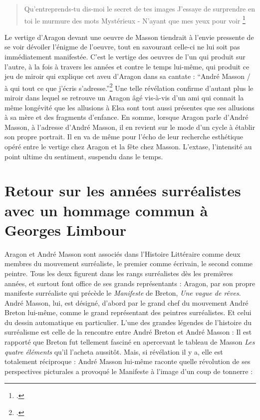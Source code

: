 \begin{verse}
Qu’entreprends-tu dis-moi le secret de tes images
J’essaye de surprendre en toi le murmure des mots
Mystérieux - N’ayant que mes yeux pour voir	
\footcite[p685]{ecritssurla}\end{verse}

	Le vertige d’Aragon devant une oeuvre de Masson tiendrait à l’envie pressente de se voir dévoiler l’énigme de l’oeuvre, tout en savourant celle-ci ne lui soit pas immédiatement manifestée. C’est le vertige des oeuvres de l’un qui produit sur l’autre, à la fois à travers les années et contre le temps lui-même, qui produit ce jeu de miroir qui explique cet aveu d’Aragon dans sa cantate : \enquote{André Masson / à qui tout ce que j’écris s’adresse.}\footcite[p692]{ecritssurla} Une telle révélation confirme d’autant plus le miroir dans lequel se retrouve un Aragon âgé vis-à-vis d’un ami qui connait la même longévité que les allusions à Elsa sont tout aussi présentes que ses allusions à sa mère et des fragments d’enfance. En somme, lorsque Aragon parle d’André Masson, à l’adresse d’André Masson, il en revient sur le mode d’un cycle à établir son propre portrait. Il en va de même pour l’écho de leur recherche esthétique opéré entre le vertige chez Aragon et la fête chez Masson. L’extase, l’intensité au point ultime du sentiment, suspendu dans le temps. 


\section{Retour sur les années surréalistes avec un hommage commun à Georges Limbour} 

Aragon et André Masson sont associés dans l’Histoire Littéraire comme deux membres du mouvement surréaliste, le premier comme écrivain, le second comme peintre. Tous les deux figurent dans les rangs surréalistes dès les premières années, et surtout font office de ses grands représentants : Aragon, par son propre manifeste surréaliste qui précède le \emph{Manifeste} de Breton, \emph{Une vague de rêves}. André Masson, lui, est désigné, d’abord par le grand chef du mouvement André Breton lui-même, comme le grand représentant des peintres surréalistes. Et celui du dessin automatique en particulier. L’une des grandes légendes de l’histoire du surréalisme est celle de la rencontre entre André Breton et André Masson : Il est rapporté que Breton fut tellement fasciné en apercevant le tableau de Masson \emph{Les quatre éléments }qu’il l’acheta aussitôt. Mais, si révélation il y a, elle est totalement réciproque : André Masson lui-même raconte quelle révolution de ses perspectives picturales a provoqué le Manifeste à l’image d’un coup de tonnerre : 

